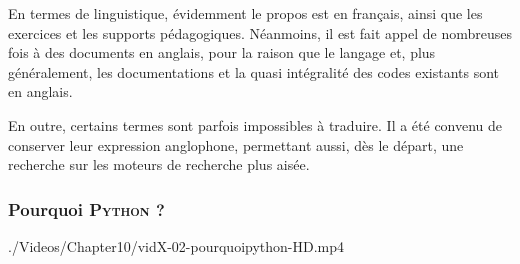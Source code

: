 En termes de linguistique, évidemment le propos est en français, ainsi que les exercices et les supports pédagogiques. Néanmoins, il est fait appel de nombreuses fois à des documents en anglais, pour la raison que le langage et, plus généralement, les documentations et la quasi intégralité des codes existants sont en anglais. 

En outre, certains termes sont parfois impossibles à traduire. Il a été convenu de conserver leur expression anglophone, permettant aussi, dès le départ, une recherche sur les moteurs de recherche plus aisée.


\subsubsection[Pourquoi \textsc{Python} ?]{Pourquoi \textsc{Python} ?}
\label{subsub:X.1.1.2}

\begin{marginvideo}
	[\label{vid:X.2}Choix de \textsc{Python}.]%
		{./Videos/Chapter10/vidX-02-pourquoipython-HD.mp4}%
\end{marginvideo}

